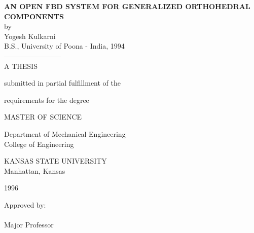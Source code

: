 \thispagestyle{empty}
\begin{center}
{\large\bf\uppercase\expandafter{An Open FBD System For Generalized
	Orthohedral Components}}\\
\vspace{0.3in}
by \\
\vspace{0.2in}
Yogesh Kulkarni\\
\vspace{0.1in}  B.S., University of Poona - India, 1994 \\
\vspace{.1in}
------------------------\\
\vspace{.15in}
A THESIS
\end{center}
\vspace{0.2in}
\begin{center}
submitted in partial fulfillment of the
\end{center}
\begin{center}
requirements for the degree
\end{center}
\vspace{0.2in}
\begin{center}
MASTER OF SCIENCE
\end{center}
\vspace{0.2in}
\begin{center}
Department of Mechanical Engineering \\
College of Engineering
\end{center}
\vspace{0.2in}
\begin{center}
KANSAS STATE UNIVERSITY \\
Manhattan, Kansas
\end{center}
\begin{center}
1996
\end{center}
\vspace{.25in}
\begin{flushright}
\parbox{2.4in}{Approved by: \\ \vspace{.4in} \\ Major Professor}
\end{flushright}
\vspace{-.2in}

